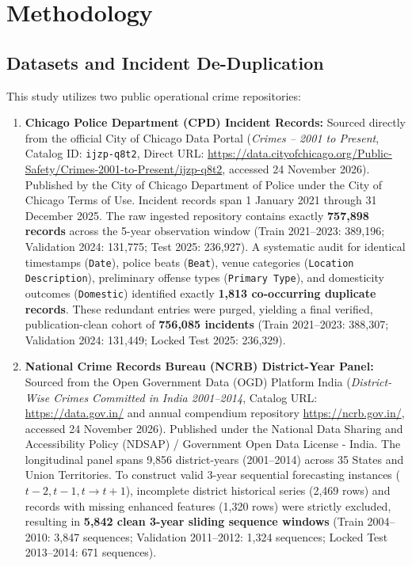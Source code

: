 \documentclass[runningheads]{llncs}
\begin{document}
\section{Methodology}
\subsection{Datasets and Incident De-Duplication}
This study utilizes two public operational crime repositories:
\begin{enumerate}
    \item \textbf{Chicago Police Department (CPD) Incident Records:} Sourced directly from the official City of Chicago Data Portal (\textit{Crimes -- 2001 to Present}, Catalog ID: \texttt{ijzp-q8t2}, Direct URL: \url{https://data.cityofchicago.org/Public-Safety/Crimes-2001-to-Present/ijzp-q8t2}, accessed 24 November 2026). Published by the City of Chicago Department of Police under the City of Chicago Terms of Use. Incident records span 1 January 2021 through 31 December 2025. The raw ingested repository contains exactly \textbf{757,898 records} across the 5-year observation window (Train 2021--2023: 389,196; Validation 2024: 131,775; Test 2025: 236,927). A systematic audit for identical timestamps (\texttt{Date}), police beats (\texttt{Beat}), venue categories (\texttt{Location Description}), preliminary offense types (\texttt{Primary Type}), and domesticity outcomes (\texttt{Domestic}) identified exactly \textbf{1,813 co-occurring duplicate records}. These redundant entries were purged, yielding a final verified, publication-clean cohort of \textbf{756,085 incidents} (Train 2021--2023: 388,307; Validation 2024: 131,449; Locked Test 2025: 236,329).
    \item \textbf{National Crime Records Bureau (NCRB) District-Year Panel:} Sourced from the Open Government Data (OGD) Platform India (\textit{District-Wise Crimes Committed in India 2001--2014}, Catalog URL: \url{https://data.gov.in/} and annual compendium repository \url{https://ncrb.gov.in/}, accessed 24 November 2026). Published under the National Data Sharing and Accessibility Policy (NDSAP) / Government Open Data License - India. The longitudinal panel spans 9,856 district-years (2001--2014) across 35 States and Union Territories. To construct valid 3-year sequential forecasting instances ($t-2, t-1, t \to t+1$), incomplete district historical series (2,469 rows) and records with missing enhanced features (1,320 rows) were strictly excluded, resulting in \textbf{5,842 clean 3-year sliding sequence windows} (Train 2004--2010: 3,847 sequences; Validation 2011--2012: 1,324 sequences; Locked Test 2013--2014: 671 sequences).
\end{enumerate}
\end{document}
